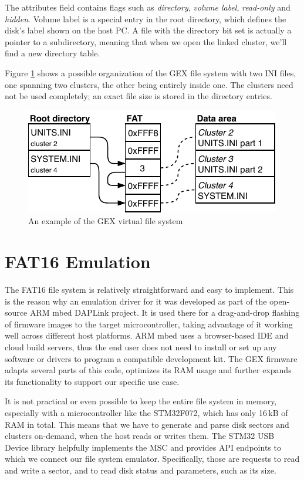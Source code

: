 The attributes field contains flags such as \textit{directory}, \textit{volume label}, \textit{read-only} and \textit{hidden}. Volume label is a special entry in the root directory, which defines the disk's label shown on the host \gls{PC}. A file with the directory bit set is actually a pointer to a subdirectory, meaning that when we open the linked cluster, we'll find a new directory table.

Figure \ref{fig:fat-example} shows a possible organization of the GEX file system with two INI files, one spanning two clusters, the other being entirely inside one. The clusters need not be used completely; an exact file size is stored in the directory entries.

\begin{figure}[h]
	\centering
	\includegraphics[scale=1.3] {img/fat-links.pdf}
	\caption{\label{fig:fat-example}An example of the GEX virtual file system}
\end{figure}


\section{FAT16 Emulation}

The FAT16 file system is relatively straightforward and easy to implement. This is the reason why an emulation driver for it was developed as part of the open-source ARM mbed DAPLink project.  It is used there for a drag-and-drop flashing of firmware images to the target microcontroller, taking advantage of it working well across different host platforms. ARM mbed uses a browser-based \gls{IDE} and cloud build servers, thus the end user does not need to install or set up any software or drivers to program a compatible development kit. The GEX firmware adapts several parts of this code, optimizes its \gls{RAM} usage and further expands its functionality to support our specific use case.

It is not practical or even possible to keep the entire file system in memory, especially with a microcontroller like the STM32F072, which has only 16\,kB of \gls{RAM} in total. This means that we have to generate and parse disk sectors and clusters on-demand, when the host reads or writes them. The STM32 \gls{USB} Device library helpfully implements the \gls{MSC} and provides \gls{API} endpoints to which we connect our file system emulator. Specifically, those are requests to read and write a sector, and to read disk status and parameters, such as its size.

